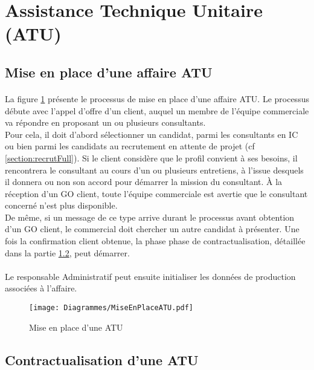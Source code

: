 \section{Assistance Technique Unitaire (ATU)}

\subsection{Mise en place d'une affaire ATU}

\paragraph{}La figure \ref{mepATU} présente le processus de mise en place d'une affaire ATU. Le processus débute avec l'appel d'offre d'un client, auquel un membre de l'équipe commerciale va répondre en proposant un ou plusieurs consultants.\\ Pour cela, il doit d'abord sélectionner un candidat, parmi les consultants en IC ou bien parmi les candidats au recrutement en attente de projet (cf \ref{section:recrutFull}).
Si le client considère que le profil convient à ses besoins, il rencontrera le consultant au cours d'un ou plusieurs entretiens, à l'issue desquels il donnera ou non son accord pour démarrer la mission du consultant. À la réception d'un GO client, toute l'équipe commerciale est avertie que le consultant concerné n'est plus disponible.\\ De même, si un message de ce type arrive durant le processus avant obtention d'un GO client, le commercial doit chercher un autre candidat à présenter.
Une fois la confirmation client obtenue, la phase phase de contractualisation, détaillée dans la partie \ref{subsection:contractATU}, peut démarrer.

\paragraph{} Le responsable Administratif peut ensuite initialiser les données de production associées à l'affaire.

\begin{figure}[H]
	\centering
	\texttt{[image: Diagrammes/MiseEnPlaceATU.pdf]}
	\caption{Mise en place d'une ATU} 
	\label{mepATU}
\end{figure}
	
	
\subsection{Contractualisation d'une ATU}
\label{subsection:contractATU}

